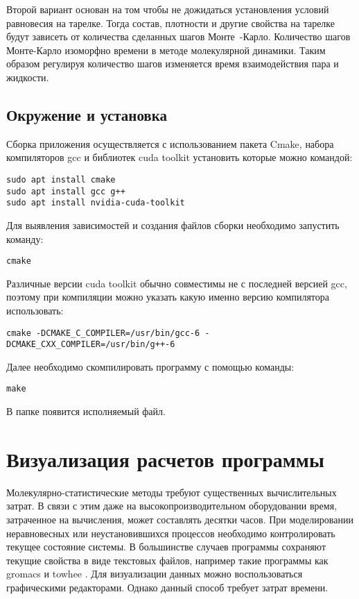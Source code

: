 Второй вариант основан на том чтобы не дожидаться установления условий равновесия на тарелке. Тогда состав, плотности и другие свойства на тарелке будут зависеть от количества сделанных шагов Монте~-Карло. Количество шагов Монте-Карло изоморфно времени в методе молекулярной динамики. Таким образом регулируя количество шагов изменяется время взаимодействия пара и жидкости. 


\subsection{Окружение и установка}

Сборка приложения осуществляется с использованием пакета Cmake, набора компиляторов gcc и библиотек cuda toolkit установить которые можно командой:
\begin{lstlisting}
sudo apt install cmake
sudo apt install gcc g++
sudo apt install nvidia-cuda-toolkit 
\end{lstlisting}

Для выявления зависимостей и создания файлов сборки необходимо запустить команду:
\begin{lstlisting}
cmake
\end{lstlisting}
Различные версии cuda toolkit обычно совместимы не с последней версией gcc, поэтому при компиляции можно указать какую именно версию компилятора использовать:
\begin{lstlisting}
cmake -DCMAKE_C_COMPILER=/usr/bin/gcc-6 -DCMAKE_CXX_COMPILER=/usr/bin/g++-6
\end{lstlisting}
Далее необходимо скомпилировать программу с помощью команды:
\begin{lstlisting}
make
\end{lstlisting}
В папке появится исполняемый файл.

\section{Визуализация расчетов программы}

Молекулярно-статистические методы требуют существенных вычислительных затрат. В связи с этим даже на высокопроизводительном оборудовании время, затраченное на вычисления, может составлять десятки часов. При моделировании неравновесных или неустановившихся процессов необходимо контролировать текущее состояние системы. В большинстве случаев программы сохраняют текущие свойства в виде текстовых файлов, например такие программы как gromacs \cite{Pronk2013} и towhee \cite{Martin2013}. Для визуализации данных можно воспользоваться графическими редакторами. Однако данный способ требует затрат времени. 

